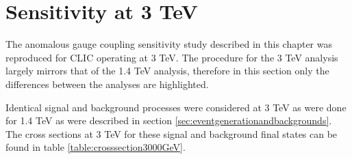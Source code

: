 \section{Sensitivity at 3 TeV}

The anomalous gauge coupling sensitivity study described in this chapter was reproduced for CLIC operating at 3 TeV.  The procedure for the 3 TeV analysis largely mirrors that of the 1.4 TeV analysis, therefore in this section only the differences between the analyses are highlighted.  

Identical signal and background processes were considered at 3 TeV as were done for 1.4 TeV as were described in section \ref{sec:eventgenerationandbackgrounds}.  The cross sections at 3 TeV for these signal and background final states can be found in table \ref{table:crosssection3000GeV}.  

